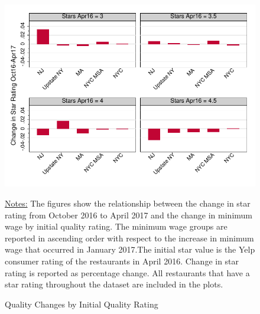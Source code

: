 \documentclass[11pt]{article}
\begin{document}
\begin{figure}[H]
\centering
\caption{Quality Changes by Initial Quality Rating}
\includegraphics[width=5in]{qualitybars.pdf}

{\footnotesize \raggedright \underline{Notes:} The figures show the relationship between the change in star rating from October 2016 to April 2017 and the change in minimum wage by initial quality rating. The minimum wage groups are reported in ascending order with respect to the increase in minimum wage that occurred in January 2017.The initial star value is the Yelp consumer rating of the restaurants in April 2016. Change in star rating is reported as percentage change. All restaurants that have a star rating throughout the dataset are included in the plots.   \par}
\end{figure}

\newpage

\vspace{20mm}
\end{document}
